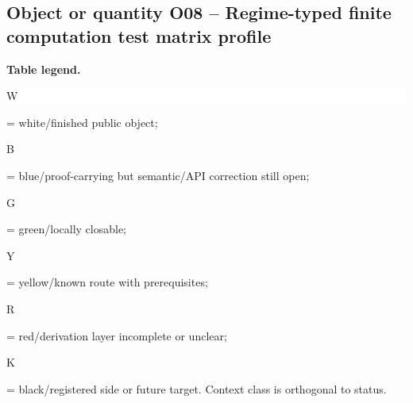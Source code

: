 \subsection*{Object or quantity O08 -- Regime-typed finite computation test matrix profile}
\hypertarget{objproof:O08}{}
\par\smallskip\noindent\begin{minipage}{0.99\linewidth}\footnotesize\raggedright\textbf{Table legend.} \colorbox{white}{\strut W} = white/finished public object; \colorbox{cyan!20}{\strut B} = blue/proof-carrying but semantic/API correction still open; \colorbox{green!18}{\strut G} = green/locally closable; \colorbox{yellow!25}{\strut Y} = yellow/known route with prerequisites; \colorbox{red!20}{\strut R} = red/derivation layer incomplete or unclear; \colorbox{black!18}{\strut K} = black/registered side or future target. Context class is orthogonal to status.\end{minipage}\par\vspace{0.25em}
